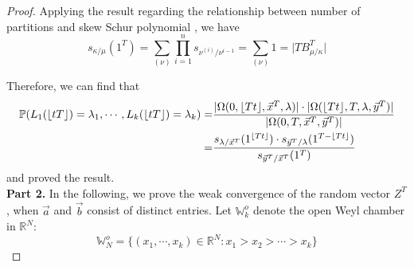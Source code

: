 \begin{proof}
Applying the result regarding the relationship between number of partitions and skew Schur polynomial \cite[Chapter 1, (5.11)]{Mac}, we have \[s_{\kappa/\mu}(1^T)=\sum_{(\nu)}\prod_{i=1}^n s_{\nu^{(i)}/\nu^{i-1}}=\sum_{(\nu)} 1=\lvert TB_{\mu/\kappa}^T\rvert\]

Therefore, we can find that 
\begin{align*}
\mathbb{P}(L_1(\lfloor tT\rfloor)=\lambda_1,\cdots, L_k(\lfloor tT\rfloor)=\lambda_k)
=&{}\frac{\lvert \Omega(0,\lfloor Tt\rfloor, \vec{x}^T, \lambda)\rvert\cdot \lvert \Omega(\lfloor Tt\rfloor ,T, \lambda, \vec{y}^T)\rvert}{\lvert \Omega(0, T, \vec{x}^T, \vec{y}^T)\rvert}\\
=&{}\frac{s_{\lambda/\vec{x}^T}(1^{\lfloor Tt\rfloor})\cdot s_{\vec{y}^T/\lambda}(1^{T-\lfloor Tt\rfloor})}{s_{\vec{y}^T/\vec{x}^T}(1^T)}
\end{align*} and proved the result.\\
\noindent \textbf{Part 2. }In the following, we prove the weak convergence of the random vector $Z^{T}$, when $\vec{a}$ and $\vec{b}$ consist of distinct entries. Let $\mathbb{W}_{k}^{o}$ denote the open Weyl chamber in $\mathbb{R}^{N}$:
$$\mathbb{W}_{N}^{o}=\{(x_{1},\cdots,x_{k})\in\mathbb{R}^{N}:x_{1}>x_{2}>\cdots>x_{k}\}$$ 


\end{proof}
